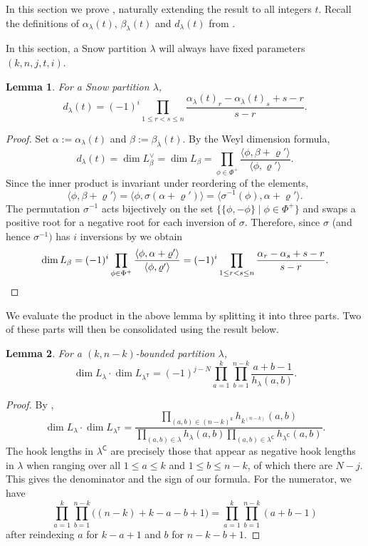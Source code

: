 \documentclass{amsart}
\newcommand\C{\mathsf{C}}
\newcommand\T{\mathsf{T}}
\theoremstyle{plain}
\newtheorem{lemma}[lemma]{Lemma}
\theoremstyle{definition}
\numberwithin{equation}{section}
\begin{document}
In this section we prove , naturally extending the result to all integers $t$. Recall the definitions of $\alpha_\lambda(t)$, $\beta_\lambda(t)$ and $d_\lambda(t)$ from .

In this section, a Snow partition $\lambda$ will always have fixed parameters $(k,n,j,t,i)$.

\begin{lemma}
    \label{lem: snow partition dimension}
For a Snow partition $\lambda$,
\[d_\lambda(t)=(-1)^i\prod_{1\leq r<s\leq n}\frac{\alpha_\lambda(t)_r-\alpha_\lambda(t)_s+s-r}{s-r}.\] 
\end{lemma}
\begin{proof}
Set $\alpha:=\alpha_\lambda(t)$ and $\beta:=\beta_\lambda(t)$. By the Weyl dimension formula,
\[d_\lambda(t)=\dim L_\beta^\vee=\dim L_\beta=\prod_{\phi\in\Phi^+}\frac{\langle \phi,\beta+\varrho'\rangle}{\langle \phi,\varrho'\rangle}.\]
Since the inner product is invariant under reordering of the elements,
\[\langle \phi,\beta+\varrho'\rangle=\langle \phi,\sigma(\alpha+\varrho')\rangle=\langle \sigma^{-1}(\phi),\alpha+\varrho'\rangle.\]
The permutation $\sigma^{-1}$ acts bijectively on the set $\{\{\phi,-\phi\}\mid \phi\in\Phi^+\}$ and swaps a positive root for a negative root for each inversion of $\sigma$. Therefore, since $\sigma$ (and hence $\sigma^{-1})$ has $i$ inversions by  we obtain
\[\dim L_\beta=(-1)^i\prod_{\phi\in\Phi^+}\frac{\langle \phi,\alpha+\varrho'\rangle}{\langle \phi,\varrho'\rangle}=(-1)^i\prod_{1\leq r<s\leq n}\frac{\alpha_r-\alpha_s+s-r}{s-r}.\qedhere\]
\end{proof}

We evaluate the product in the above lemma by splitting it into three parts. Two of these parts will then be consolidated using the result below.

\begin{lemma}\label{lem:skew-howe-dimension}
For a $(k,n-k)$-bounded partition $\lambda$,
\[\dim L_\lambda\cdot \dim L_{\lambda^\T}=(-1)^{j-N}\prod_{a=1}^k\prod_{b=1}^{n-k}\frac{a+b-1}{h_{\lambda}(a,b)}.\]
\end{lemma}
\begin{proof}
By \cite[\S2.1]{Gre18},
\[\dim L_\lambda\cdot \dim L_{\lambda^\T}=\frac{\prod_{(a,b)\in (n-k)^k} h_{k^{(n-k)}}(a,b)}{\prod_{(a,b)\in\lambda}h_\lambda(a,b)\prod_{(a,b)\in\lambda^\C}h_{\lambda^\C}(a,b)}.\]
The hook lengths in $\lambda^\C$ are precisely those that appear as negative hook lengths in $\lambda$ when ranging over all $1\leq a\leq k$ and $1\leq b\leq n-k$, of which there are $N-j$. This gives the denominator and the sign of our formula. For the numerator, we have
\[\prod_{a=1}^k\prod_{b=1}^{n-k}\bigl((n-k)+k-a-b+1\bigr) = \prod_{a=1}^k\prod_{b=1}^{n-k}(a+b-1)\]
after reindexing $a$ for $k-a+1$ and $b$ for $n-k-b+1$.
\end{proof}
\end{document}
